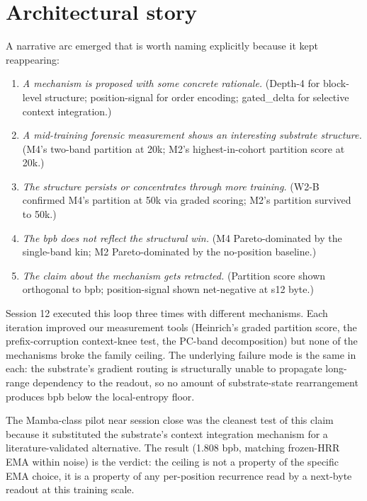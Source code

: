 \section{Architectural story}

A narrative arc emerged that is worth naming explicitly because it kept reappearing:

\begin{enumerate}
  \item \emph{A mechanism is proposed with some concrete rationale.} (Depth-4 for block-level structure; position-signal for order encoding; gated\_delta for selective context integration.)
  \item \emph{A mid-training forensic measurement shows an interesting substrate structure.} (M4's two-band partition at 20k; M2's highest-in-cohort partition score at 20k.)
  \item \emph{The structure persists or concentrates through more training.} (W2-B confirmed M4's partition at 50k via graded scoring; M2's partition survived to 50k.)
  \item \emph{The bpb does not reflect the structural win.} (M4 Pareto-dominated by the single-band kin; M2 Pareto-dominated by the no-position baseline.)
  \item \emph{The claim about the mechanism gets retracted.} (Partition score shown orthogonal to bpb; position-signal shown net-negative at s12 byte.)
\end{enumerate}

Session 12 executed this loop three times with different mechanisms. Each iteration improved our measurement tools (Heinrich's graded partition score, the prefix-corruption context-knee test, the PC-band decomposition) but none of the mechanisms broke the family ceiling. The underlying failure mode is the same in each: the substrate's gradient routing is structurally unable to propagate long-range dependency to the readout, so no amount of substrate-state rearrangement produces bpb below the local-entropy floor.

The Mamba-class pilot near session close was the cleanest test of this claim because it substituted the substrate's context integration mechanism for a literature-validated alternative. The result (1.808 bpb, matching frozen-HRR EMA within noise) is the verdict: the ceiling is not a property of the specific EMA choice, it is a property of any per-position recurrence read by a next-byte readout at this training scale.

